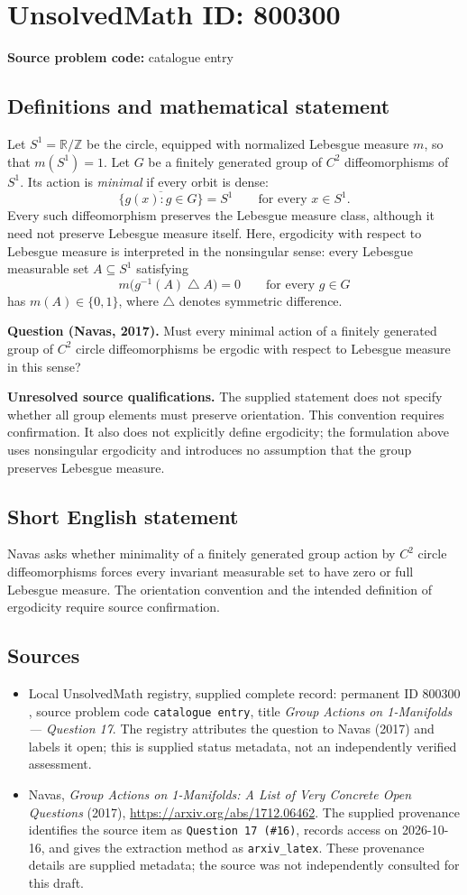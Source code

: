 \documentclass[11pt]{article}
\newcommand{\Z}{\mathbb{Z}}
\newcommand{\R}{\mathbb{R}}
\begin{document}
\section*{UnsolvedMath ID: 800300}
\textbf{Source problem code:} catalogue entry
\subsection{Definitions and mathematical statement}
Let \(S^1=\R/\Z\) be the circle, equipped with normalized Lebesgue measure \(m\), so that \(m(S^1)=1\). Let \(G\) be a finitely generated group of \(C^2\) diffeomorphisms of \(S^1\). Its action is \emph{minimal} if every orbit is dense:
\[
\overline{\{g(x):g\in G\}}=S^1\qquad\text{for every }x\in S^1.
\]
Every such diffeomorphism preserves the Lebesgue measure class, although it need not preserve Lebesgue measure itself. Here, ergodicity with respect to Lebesgue measure is interpreted in the nonsingular sense: every Lebesgue measurable set \(A\subseteq S^1\) satisfying
\[
m\bigl(g^{-1}(A)\mathbin{\triangle}A\bigr)=0\qquad\text{for every }g\in G
\]
has \(m(A)\in\{0,1\}\), where \(\triangle\) denotes symmetric difference.

\textbf{Question (Navas, 2017).} Must every minimal action of a finitely generated group of \(C^2\) circle diffeomorphisms be ergodic with respect to Lebesgue measure in this sense?

\textbf{Unresolved source qualifications.} The supplied statement does not specify whether all group elements must preserve orientation. This convention requires confirmation. It also does not explicitly define ergodicity; the formulation above uses nonsingular ergodicity and introduces no assumption that the group preserves Lebesgue measure.
\subsection{Short English statement}
Navas asks whether minimality of a finitely generated group action by \(C^2\) circle diffeomorphisms forces every invariant measurable set to have zero or full Lebesgue measure. The orientation convention and the intended definition of ergodicity require source confirmation.
\subsection{Sources}
\begin{itemize}
\item Local UnsolvedMath registry, supplied complete record: permanent ID \(800300\), source problem code \texttt{catalogue entry}, title \emph{Group Actions on 1-Manifolds --- Question 17}. The registry attributes the question to Navas (2017) and labels it open; this is supplied status metadata, not an independently verified assessment.
\item Navas, \emph{Group Actions on 1-Manifolds: A List of Very Concrete Open Questions} (2017), \url{https://arxiv.org/abs/1712.06462}. The supplied provenance identifies the source item as \texttt{Question 17 (\#16)}, records access on 2026-10-16, and gives the extraction method as \texttt{arxiv\_latex}. These provenance details are supplied metadata; the source was not independently consulted for this draft.
\end{itemize}
\end{document}
